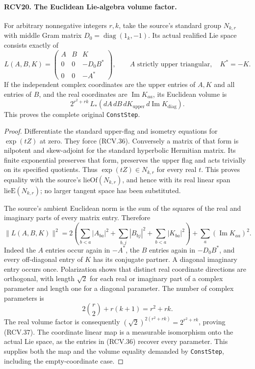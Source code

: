 \paragraph{RCV20. The Euclidean Lie-algebra volume factor.}
\label{claim:RCV20}
For arbitrary nonnegative integers \(r,k\), take the source's
standard group \(N_{k,r}\) with middle Gram matrix
\(D_0=\operatorname{diag}(1_k,-1)\).  Its actual realified
Lie space consists exactly of
\[
 L(A,B,K)=
 \begin{pmatrix}
 A&B&K\\ 0&0&-D_0B^*\\0&0&-A^*
 \end{pmatrix},\qquad
 A\text{ strictly upper triangular},\quad K^*=-K.
\tag{RCV.36}
\]
If the independent complex coordinates are the upper entries of
\(A,K\) and all entries of \(B\), and the real coordinates
are \(\operatorname{Im}K_{aa}\), its Euclidean volume is
\[
        2^{r^2+rk}\,L_*\!\left(dA\,dB\,dK_{\mathrm{upper}}
                                      \,d\operatorname{Im}K_{\mathrm{diag}}\right).
\tag{RCV.37}
\]
This proves the complete original \texttt{ConstStep}.
\begin{proof}
Differentiate the standard upper-flag and isometry equations for
\(\exp(tZ)\) at zero.  They force (RCV.36).  Conversely a matrix
of that form is nilpotent and skew-adjoint for the standard
hyperbolic Hermitian matrix.  Its finite exponential preserves
that form, preserves the upper flag and acts trivially on its
specified quotients.  Thus \(\exp(tZ)\in N_{k,r}\) for every
real \(t\).  This proves equality with the source's
\(\mathrm{lieOf}(N_{k,r})\), and hence with its real linear
span \(\mathrm{lieE}(N_{k,r})\); no larger tangent space has
been substituted.

The source's ambient Euclidean norm is the sum of the squares of
the real and imaginary parts of every matrix entry.  Therefore
\[
 \|L(A,B,K)\|^2
  =2\left(\sum_{b<a}|A_{ba}|^2+
           \sum_{b,j}|B_{bj}|^2+
           \sum_{b<a}|K_{ba}|^2\right)
                          +\sum_a(\operatorname{Im}K_{aa})^2.
\tag{RCV.38}
\]
Indeed the \(A\) entries occur again in \(-A^*\), the \(B\)
entries again in \(-D_0B^*\), and every off-diagonal entry of
\(K\) has its conjugate partner.  A diagonal imaginary entry
occurs once.  Polarization shows that distinct real coordinate
directions are orthogonal, with length \(\sqrt2\) for each
real or imaginary part of a complex parameter and length one
for a diagonal parameter.  The number of complex parameters is
\[
              2\binom r2+r(k+1)=r^2+rk.
\]
The real volume factor is consequently
\((\sqrt2)^{2(r^2+rk)}=2^{r^2+rk}\), proving (RCV.37).
The coordinate linear map is a measurable isomorphism onto the
actual Lie space, as the entries in (RCV.36) recover every parameter.
This supplies both the map and the volume equality demanded by
\texttt{ConstStep}, including the empty-coordinate case.
\end{proof}

